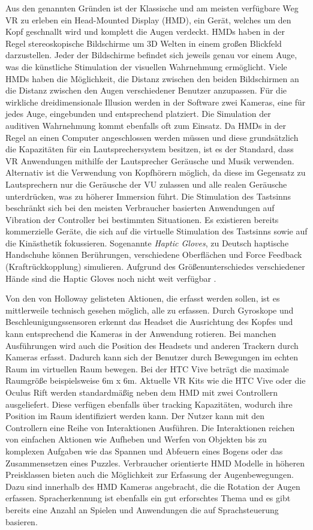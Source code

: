 Aus den genannten Gründen ist der Klassische und am meisten verfügbare Weg VR zu erleben ein Head-Mounted Display (HMD), ein Gerät, welches um den Kopf geschnallt wird und komplett die Augen verdeckt. HMDs haben in der Regel stereoskopische Bildschirme um 3D Welten in einem großen Blickfeld darzustellen. Jeder der Bildschirme befindet sich jeweils genau vor einem Auge, was die künstliche Stimulation der visuellen Wahrnehmung ermöglicht. Viele HMDs haben die Möglichkeit, die Distanz zwischen den beiden Bildschirmen an die Distanz zwischen den Augen verschiedener Benutzer anzupassen. Für die wirkliche dreidimensionale Illusion werden in der Software zwei Kameras, eine für jedes Auge, eingebunden und entsprechend platziert.
Die Simulation der auditiven Wahrnehmung kommt ebenfalls oft zum Einsatz. Da HMDs in der Regel an einen Computer angeschlossen werden müssen und diese grundsätzlich die Kapazitäten für ein Lautsprechersystem besitzen, ist es der Standard, dass VR Anwendungen mithilfe der Lautsprecher Geräusche und Musik verwenden. Alternativ ist die Verwendung von Kopfhörern möglich, da diese im Gegensatz zu Lautsprechern nur die Geräusche der VU zulassen und alle realen Geräusche unterdrücken, was zu höherer Immersion führt. Die Stimulation des Tastsinns beschränkt sich bei den meisten Verbraucher basierten Anwendungen auf Vibration der Controller bei bestimmten Situationen. Es existieren bereits kommerzielle Geräte, die sich auf die virtuelle Stimulation des Tastsinns sowie auf die Kinästhetik fokussieren. Sogenannte \textit{Haptic Gloves}, zu Deutsch haptische Handschuhe können Berührungen, verschiedene Oberflächen und Force Feedback (Kraftrückkopplung) simulieren. Aufgrund des Größenunterschiedes verschiedener Hände sind die Haptic Gloves noch nicht weit verfügbar \cite{Perret2018}.

Von den von Holloway \cite{Holloway1995} gelisteten Aktionen, die erfasst werden sollen, ist es mittlerweile technisch gesehen möglich, alle zu erfassen.
Durch Gyroskope und Beschleunigungssensoren erkennt das Headset die Ausrichtung des Kopfes und kann entsprechend die Kameras in der Anwendung rotieren. Bei manchen Ausführungen wird auch die Position des Headsets und anderen Trackern durch Kameras erfasst. Dadurch kann sich der Benutzer durch Bewegungen im echten Raum im virtuellen Raum bewegen. \cite{Boas2012}\cite{Holloway1995} Bei der HTC Vive beträgt die maximale Raumgröße beispielsweise 6m x 6m.
Aktuelle VR Kits wie die HTC Vive oder die Oculus Rift werden standardmäßig neben dem HMD mit zwei Controllern ausgeliefert. Diese verfügen ebenfalls über tracking Kapazitäten, wodurch ihre Position im Raum identifiziert werden kann. Der Nutzer kann mit den Controllern eine Reihe von Interaktionen Ausführen. Die Interaktionen reichen von einfachen Aktionen wie Aufheben und Werfen von Objekten bis zu komplexen Aufgaben wie das Spannen und Abfeuern eines Bogens oder das Zusammensetzen eines Puzzles. Verbraucher orientierte HMD Modelle in höheren Preisklassen bieten auch die Möglichkeit zur Erfassung der Augenbewegungen. Dazu sind innerhalb des HMD Kameras angebracht, die die Rotation der Augen erfassen. Spracherkennung ist ebenfalls ein gut erforschtes Thema und es gibt bereits eine Anzahl an Spielen und Anwendungen die auf Sprachsteuerung basieren. \cite{Lamberti2017} 

